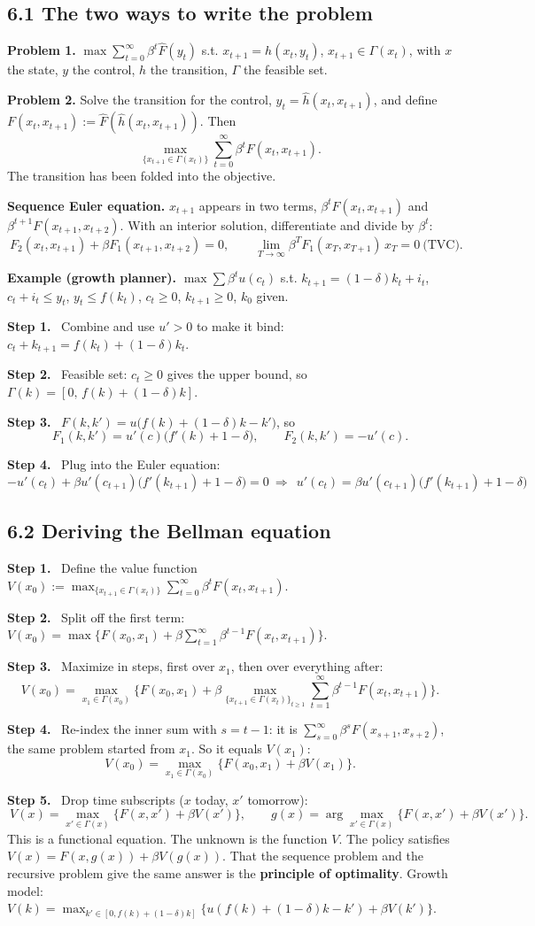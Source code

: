 \documentclass[12pt]{article}
\newcommand{\st}[1]{\par\smallskip\textbf{Step #1.}\ }
\newcommand{\ans}[1]{\[\boxed{\ #1\ }\]}
\begin{document}
\subsection*{6.1 The two ways to write the problem}
\textbf{Problem 1.} $\max\sum_{t=0}^\infty\beta^t\hat F(y_t)$ s.t. $x_{t+1}=h(x_t,y_t)$, $x_{t+1}\in\Gamma(x_t)$,
with $x$ the state, $y$ the control, $h$ the transition, $\Gamma$ the feasible set.

\textbf{Problem 2.} Solve the transition for the control, $y_t=\hat h(x_t,x_{t+1})$,
and define $F(x_t,x_{t+1}):=\hat F(\hat h(x_t,x_{t+1}))$. Then
\[
\max_{\{x_{t+1}\in\Gamma(x_t)\}}\sum_{t=0}^\infty\beta^tF(x_t,x_{t+1}).
\]
The transition has been folded into the objective.

\textbf{Sequence Euler equation.} $x_{t+1}$ appears in two terms,
$\beta^tF(x_t,x_{t+1})$ and $\beta^{t+1}F(x_{t+1},x_{t+2})$. With an interior
solution, differentiate and divide by $\beta^t$:
\ans{F_2(x_t,x_{t+1})+\beta F_1(x_{t+1},x_{t+2})=0,\qquad\lim_{T\to\infty}\beta^TF_1(x_T,x_{T+1})\,x_T=0\ \text{(TVC).}}

\textbf{Example (growth planner).} $\max\sum\beta^tu(c_t)$ s.t.
$k_{t+1}=(1-\delta)k_t+i_t$, $c_t+i_t\le y_t$, $y_t\le f(k_t)$, $c_t\ge0$, $k_{t+1}\ge0$, $k_0$ given.
\st{1} Combine and use $u'>0$ to make it bind: $c_t+k_{t+1}=f(k_t)+(1-\delta)k_t$.
\st{2} Feasible set: $c_t\ge0$ gives the upper bound, so $\Gamma(k)=[0,\,f(k)+(1-\delta)k]$.
\st{3} $F(k,k')=u\big(f(k)+(1-\delta)k-k'\big)$, so
\[
F_1(k,k')=u'(c)\big(f'(k)+1-\delta\big),\qquad F_2(k,k')=-u'(c).
\]
\st{4} Plug into the Euler equation:
\[
-u'(c_t)+\beta u'(c_{t+1})\big(f'(k_{t+1})+1-\delta\big)=0\ \Longrightarrow\ \boxed{\ u'(c_t)=\beta u'(c_{t+1})\big(f'(k_{t+1})+1-\delta\big)\ }
\]

\subsection*{6.2 Deriving the Bellman equation}
\st{1} Define the value function $V(x_0):=\max_{\{x_{t+1}\in\Gamma(x_t)\}}\sum_{t=0}^\infty\beta^tF(x_t,x_{t+1})$.
\st{2} Split off the first term:
$V(x_0)=\max\big\{F(x_0,x_1)+\beta\sum_{t=1}^\infty\beta^{t-1}F(x_t,x_{t+1})\big\}$.
\st{3} Maximize in steps, first over $x_1$, then over everything after:
\[
V(x_0)=\max_{x_1\in\Gamma(x_0)}\Big\{F(x_0,x_1)+\beta\max_{\{x_{t+1}\in\Gamma(x_t)\}_{t\ge1}}\sum_{t=1}^\infty\beta^{t-1}F(x_t,x_{t+1})\Big\}.
\]
\st{4} Re-index the inner sum with $s=t-1$: it is $\sum_{s=0}^\infty\beta^sF(x_{s+1},x_{s+2})$, the same problem started from $x_1$. So it equals $V(x_1)$:
\[
V(x_0)=\max_{x_1\in\Gamma(x_0)}\big\{F(x_0,x_1)+\beta V(x_1)\big\}.
\]
\st{5} Drop time subscripts ($x$ today, $x'$ tomorrow):
\ans{V(x)=\max_{x'\in\Gamma(x)}\big\{F(x,x')+\beta V(x')\big\},\qquad g(x)=\arg\max_{x'\in\Gamma(x)}\big\{F(x,x')+\beta V(x')\big\}.}
This is a functional equation. The unknown is the function $V$. The policy
satisfies $V(x)=F(x,g(x))+\beta V(g(x))$. That the sequence problem and the
recursive problem give the same answer is the \textbf{principle of optimality}.
Growth model: $V(k)=\max_{k'\in[0,f(k)+(1-\delta)k]}\{u(f(k)+(1-\delta)k-k')+\beta V(k')\}$.
\end{document}
